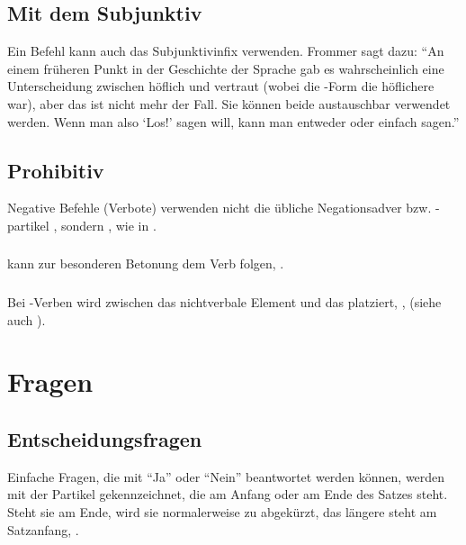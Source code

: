 \subsection{Mit dem Subjunktiv} Ein Befehl kann auch das Subjunktivinfix  verwenden. Frommer sagt dazu: ``An einem früheren Punkt in der Geschichte der Sprache gab es wahrscheinlich eine Unterscheidung zwischen höflich und vertraut (wobei die -Form die höflichere war), aber das ist nicht mehr der Fall. Sie können beide austauschbar verwendet werden. Wenn man also `Los!' sagen will, kann man entweder  oder einfach  sagen.''


\subsection{Prohibitiv} Negative Befehle (Verbote) verwenden nicht die übliche Negationsadver bzw. -partikel , sondern , wie in  .
\label{syntax:prohibitions}

\subsubsection{}  kann zur besonderen Betonung dem Verb folgen,  .

\subsubsection{} Bei -Verben wird  zwischen das nichtverbale Element und das  platziert,  ,   (siehe auch ).

\section{Fragen}
\subsection{Entscheidungsfragen} 
Einfache Fragen, die mit ``Ja'' oder ``Nein'' beantwortet werden können, werden mit der Partikel  gekennzeichnet, die am Anfang oder am Ende des Satzes steht. Steht sie am Ende, wird sie normalerweise zu  abgekürzt, das längere  steht am Satzanfang,  .

